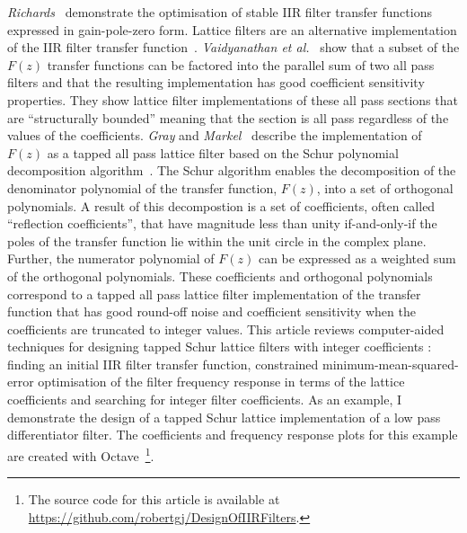 \documentclass[a4paper,twoside,10pt,english]{article}
\begin{document}
\emph{Richards}~\cite{Richards_DeczkyRecursiveDecimator} demonstrate the
optimisation of stable IIR filter transfer functions expressed in gain-pole-zero
form.
Lattice filters are an alternative implementation of the IIR filter
transfer function~\cite{VaidyanathanMitra_RobustFilterStructures}.
\emph{Vaidyanathan et
  al.}~\cite{VaidyanathanMitraNuevo_LowSensitivityIIRDigitalFilters,
  RegaliaMitraVaidyanathan_DigitalAllPassFilterVersatileSignalProcessing} show
that a subset of the $F\left(z\right)$ transfer functions can be factored into
the parallel sum of two all pass filters and that the resulting implementation
has good coefficient sensitivity properties. They show lattice filter
implementations of these all pass sections that are ``structurally bounded''
meaning that the section is all pass regardless of the values of the
coefficients. \emph{Gray} and
\emph{Markel}~\cite{GrayMarkel_DigitalLatticeAndLadderFilterSynthesis,
  MarkelGray_AutocorrelationSpeechAnalysis} describe the implementation of
$F\left(z\right)$ as a tapped all pass lattice filter based on the Schur
polynomial decomposition algorithm~\cite{SchurMethodsInOperatorTheory_Kailath,
  SchurMethodsInOperatorTheory_Schur_I}.
The Schur algorithm enables the decomposition of the denominator polynomial of
the transfer function, $F\left(z\right)$, into a set of orthogonal
polynomials. A result of this decompostion is a set of coefficients, often
called ``reflection coefficients'', that have magnitude less than unity
if-and-only-if the poles of the transfer function lie within the unit circle in
the complex plane. Further, the numerator polynomial of $F\left(z\right)$ can be
expressed as a weighted sum of the orthogonal polynomials. These coefficients and
orthogonal polynomials correspond to a tapped all pass lattice filter
implementation of the transfer function that has good round-off noise and
coefficient sensitivity when the coefficients are truncated to integer values.
This article reviews computer-aided techniques for designing tapped Schur
lattice filters with integer coefficients : finding an initial IIR filter
transfer function, constrained minimum-mean-squared-error optimisation of the
filter frequency response in terms of the lattice coefficients and searching for
integer filter coefficients. As an example, I demonstrate the design of a tapped
Schur lattice implementation of a low pass differentiator filter. The
coefficients and frequency response plots for this example are created with
Octave~\cite{Eaton_Octave,Octave_OptimPackage,Octave_SignalPackage}\footnote{The
source code for this article is available at
\url{https://github.com/robertgj/DesignOfIIRFilters}.}.
\end{document}
